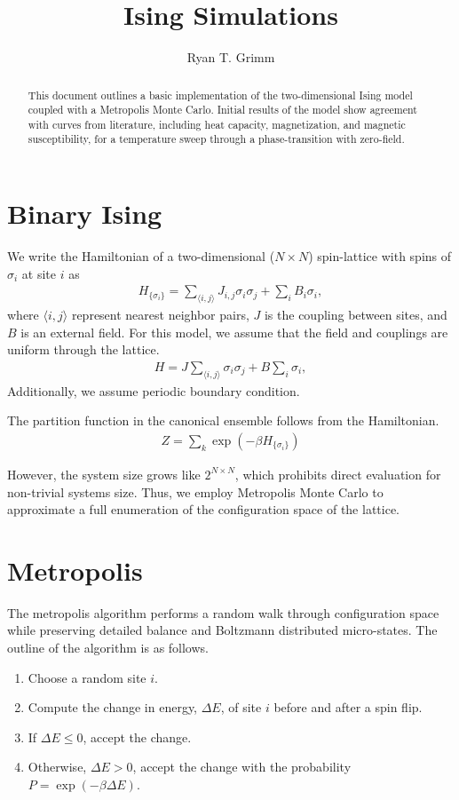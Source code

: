 \documentclass[11pt]{article}
\title{Ising Simulations}
\author{Ryan T. Grimm}
\begin{document}
    \maketitle

\begin{abstract}
This document outlines a basic implementation of the two-dimensional Ising model coupled with a Metropolis Monte Carlo.
Initial results of the model show agreement with curves from literature, including heat capacity, magnetization, and magnetic susceptibility,
for a temperature sweep through a phase-transition with zero-field.
\end{abstract}


\section*{Binary Ising}
    We write the Hamiltonian of a two-dimensional ($N \times N$) spin-lattice with spins of $\sigma_{i}$ at site $i$ as
    \begin{align*}
        H _{\{\sigma_i\}}= \sum_{\langle i,j \rangle} J_{i,j} \sigma_i \sigma_j + \sum_i B_i \sigma_i,
    \end{align*} where $\langle i,j \rangle$ represent nearest neighbor pairs, $J$ is the coupling between sites, and $B$ is an external field.
    For this model, we assume that the field and couplings are uniform through the lattice.
    \begin{align*}
        H = J \sum_{\langle i,j \rangle} \sigma_i \sigma_j + B \sum_i \sigma_i,
    \end{align*}
    Additionally, we assume periodic boundary condition.

    The partition function in the canonical ensemble follows from the Hamiltonian.
    \begin{align*}
        Z = \sum_k \exp{\left(-\beta H_{\{\sigma_i\}}\right)}
    \end{align*}


    However, the system size grows like $2^{N \times N}$, which prohibits direct evaluation for non-trivial systems size.
    Thus, we employ Metropolis Monte Carlo to approximate a full enumeration of the configuration space of the lattice.
\section*{Metropolis}
The metropolis algorithm performs a random walk through configuration space while preserving detailed balance and Boltzmann distributed micro-states.
The outline of the algorithm is as follows.
    \begin{enumerate}
        \item Choose a random site $i$.
        \item Compute the change in energy, $\Delta E$, of site $i$ before and after a spin flip.
        \item If $\Delta E \leq 0$, accept the change.
        \item Otherwise, $\Delta E > 0$, accept the change with the probability $P = \exp(- \beta  \Delta E).$
    \end{enumerate} \\
\end{document}
